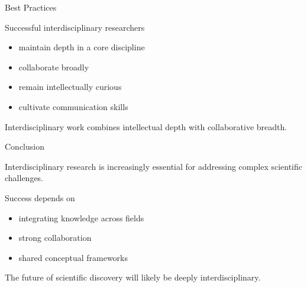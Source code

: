 \documentclass{beamer}
\begin{document}

\begin{frame}{Best Practices}

Successful interdisciplinary researchers

\begin{itemize}
\item maintain depth in a core discipline
\item collaborate broadly
\item remain intellectually curious
\item cultivate communication skills
\end{itemize}

Interdisciplinary work combines intellectual
depth with collaborative breadth.

\end{frame}


\begin{frame}{Conclusion}

Interdisciplinary research is increasingly essential
for addressing complex scientific challenges.

Success depends on

\begin{itemize}
\item integrating knowledge across fields
\item strong collaboration
\item shared conceptual frameworks
\end{itemize}

The future of scientific discovery will likely be
deeply interdisciplinary.

\end{frame}
\end{document}
